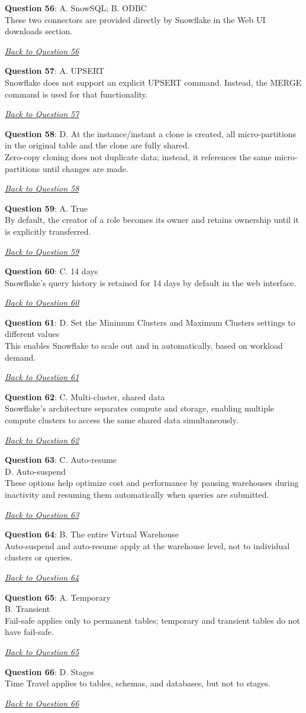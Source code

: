 \documentclass[12pt]{article}
\newcommand{\answer}[2]{%
  \textbf{Question #1}\label{ans:#1}: #2\par
  \smallskip\emph{\hyperref[q:#1]{Back to Question #1}}\par\medskip
}
\begin{document}
\answer{56}{A. SnowSQL; B. ODBC \\
These two connectors are provided directly by Snowflake in the Web UI downloads section.}

\answer{57}{A. UPSERT \\
Snowflake does not support an explicit UPSERT command. Instead, the MERGE command is used for that functionality.}

\answer{58}{D. At the instance/instant a clone is created, all micro-partitions in the original table and the clone are fully shared. \\
Zero-copy cloning does not duplicate data; instead, it references the same micro-partitions until changes are made.}

\answer{59}{A. True \\
By default, the creator of a role becomes its owner and retains ownership until it is explicitly transferred.}

\answer{60}{C. 14 days \\
Snowflake’s query history is retained for 14 days by default in the web interface.}

\answer{61}{D. Set the Minimum Clusters and Maximum Clusters settings to different values \\
This enables Snowflake to scale out and in automatically, based on workload demand.}

\answer{62}{C. Multi-cluster, shared data \\
Snowflake’s architecture separates compute and storage, enabling multiple compute clusters to access the same shared data simultaneously.}

\answer{63}{C. Auto-resume \\
D. Auto-suspend \\
These options help optimize cost and performance by pausing warehouses during inactivity and resuming them automatically when queries are submitted.}

\answer{64}{B. The entire Virtual Warehouse \\
Auto-suspend and auto-resume apply at the warehouse level, not to individual clusters or queries.}

\answer{65}{A. Temporary \\
B. Transient \\
Fail-safe applies only to permanent tables; temporary and transient tables do not have fail-safe.}

\answer{66}{D. Stages \\
Time Travel applies to tables, schemas, and databases, but not to stages.}
\end{document}
